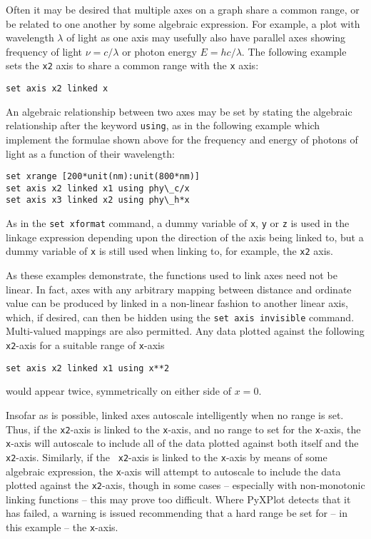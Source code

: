 Often it may be desired that multiple axes on a graph share a common range, or
be related to one another by some algebraic expression. For example, a plot
with wavelength $\lambda$ of light as one axis may usefully also have parallel
axes showing frequency of light $\nu=c/\lambda$ or photon energy
$E=hc/\lambda$. The following example sets the {\tt x2} axis to share a common
range with the {\tt x} axis:
\begin{verbatim}
set axis x2 linked x
\end{verbatim}
An algebraic relationship between two axes may be set by stating the algebraic
relationship after the keyword {\tt using}, as in the following example which
implement the formulae shown above for the frequency and energy of photons of
light as a function of their wavelength:
\begin{verbatim}
set xrange [200*unit(nm):unit(800*nm)]
set axis x2 linked x1 using phy\_c/x
set axis x3 linked x2 using phy\_h*x
\end{verbatim}
As in the {\tt set xformat} command, a dummy variable of {\tt x}, {\tt y} or
{\tt z} is used in the linkage expression depending upon the direction of the
axis being linked to, but a dummy variable of {\tt x} is still used when
linking to, for example, the {\tt x2} axis.

As these examples demonstrate, the functions used to link axes need not be
linear. In fact, axes with any arbitrary mapping between distance and ordinate
value can be produced by linked in a non-linear fashion to another linear axis,
which, if desired, can then be hidden using the {\tt set axis invisible}
command. Multi-valued mappings are also permitted. Any data plotted against the
following {\tt x2}-axis for a suitable range of {\tt x}-axis
\begin{verbatim}
set axis x2 linked x1 using x**2
\end{verbatim}
would appear twice, symmetrically on either side of $x=0$.

Insofar as is possible, linked axes autoscale intelligently when no range is
set.  Thus, if the {\tt x2}-axis is linked to the {\tt x}-axis, and no range to
set for the {\tt x}-axis, the {\tt x}-axis will autoscale to include all of the
data plotted against both itself and the {\tt x2}-axis. Similarly, if the {\tt
x2}-axis is linked to the {\tt x}-axis by means of some algebraic expression,
the {\tt x}-axis will attempt to autoscale to include the data plotted against
the {\tt x2}-axis, though in some cases -- especially with non-monotonic
linking functions -- this may prove too difficult. Where PyXPlot detects that
it has failed, a warning is issued recommending that a hard range be set for --
in this example -- the {\tt x}-axis.

